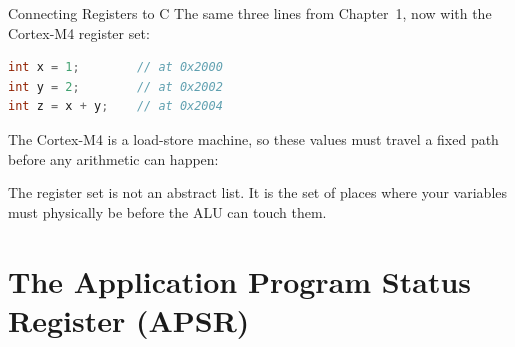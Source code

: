 \documentclass[9pt,aspectratio=169,xcolor=table]{beamer}
\begin{document}
\begin{frame}[fragile]{Connecting Registers to C}
    The same three lines from Chapter~1, now with the Cortex-M4 register set:

    \vspace{2mm}
    \begin{center}
    \begin{minipage}{.4\textwidth}
\begin{lstlisting}[language=C, basicstyle=\ttfamily\normalsize]
int x = 1;        // at 0x2000
int y = 2;        // at 0x2002
int z = x + y;    // at 0x2004
\end{lstlisting}
    \end{minipage}
    \end{center}

    \vspace{1mm}
    The Cortex-M4 is a load-store machine, so these values must travel a
    fixed path before any arithmetic can happen:

    \vspace{0mm}
    \begin{center}
    \end{center}

    \vspace{2mm}
    {\small The register set is not an abstract list. It is the set
    of places where your variables must \alert{physically be} before
    the ALU can touch them.}
\end{frame}


\section{The Application Program Status Register (APSR)}
\end{document}
